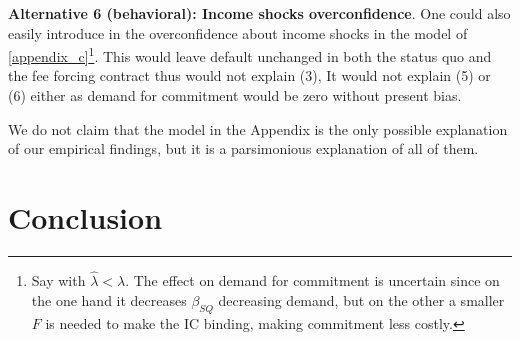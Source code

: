 \documentclass[oneside,11pt]{article}
\begin{document}
\vspace{.1in}
\noindent \textbf{Alternative 6 (behavioral): Income shocks overconfidence}. One could also easily introduce in the overconfidence about income shocks in the model of \ref{appendix_c}\footnote{Say with $\widehat{\lambda} <\lambda$. The effect on demand for commitment is uncertain since on the one hand it decreases $\beta_{SQ}$ decreasing demand, but on the other a smaller $F$ is needed to make the IC binding, making commitment less costly.}. This would leave default unchanged in both the status quo and the fee forcing contract thus would not explain (3), %
It would not explain (5) or (6) either as demand for commitment would be zero without present bias. 




\vspace{.1in}
We do not claim that the model in the Appendix is the only possible explanation of our empirical findings, but it is a parsimonious explanation of all of them.



    
\section{Conclusion} \label{conclusion}
\end{document}
